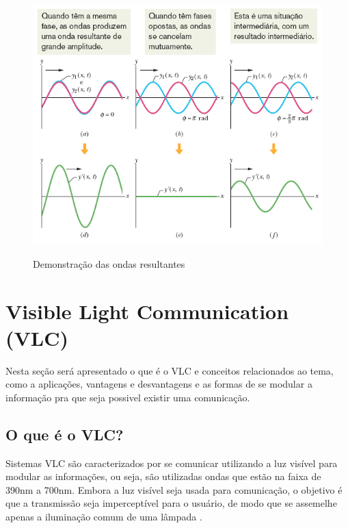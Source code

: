 \begin{figure}[!htbp]
  \caption{Demonstração das ondas resultantes}
  \includegraphics[scale=0.5]{images/ondas_interferencia.png}
  \label{fig:ondas_inter}
\end{figure}


\section{Visible Light Communication (VLC)}

Nesta seção será apresentado o que é o VLC e conceitos relacionados ao tema, como a aplicações, vantagens e desvantagens e as formas de se modular a informação pra que seja possivel existir uma comunicação.

\subsection{O que é o VLC?}

Sistemas VLC são caracterizados por se comunicar utilizando a luz visível para modular as informações, ou seja, são utilizadas ondas que estão na faixa de 390nm a 700nm. Embora a luz visível seja usada para comunicação, o objetivo é que a transmissão seja imperceptível para o usuário, de modo que se assemelhe apenas a iluminação comum de uma lâmpada \cite{matheus2017comunicaccao}.

